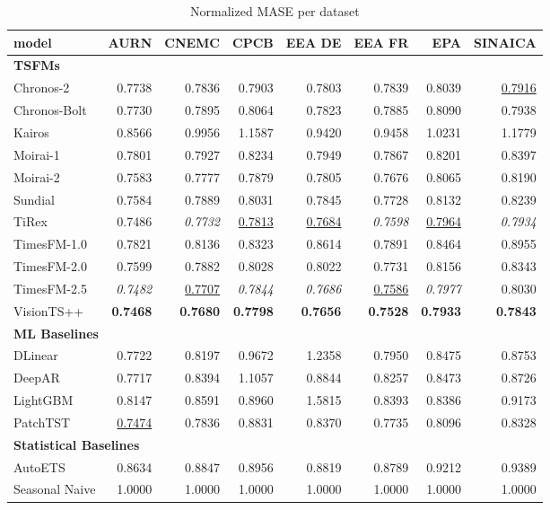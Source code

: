 \begin{table}[H]
\caption{Normalized MASE per dataset}
\centering
\begin{small}
\begin{tabular}{lrrrrrrr}
\toprule
model & AURN & CNEMC & CPCB & EEA DE & EEA FR & EPA & SINAICA \\
\midrule
\multicolumn{8}{l}{\textbf{TSFMs}} \\
Chronos-2 & 0.7738 & 0.7836 & 0.7903 & 0.7803 & 0.7839 & 0.8039 & \underline{0.7916} \\
Chronos-Bolt & 0.7730 & 0.7895 & 0.8064 & 0.7823 & 0.7885 & 0.8090 & 0.7938 \\
Kairos & 0.8566 & 0.9956 & 1.1587 & 0.9420 & 0.9458 & 1.0231 & 1.1779 \\
Moirai-1 & 0.7801 & 0.7927 & 0.8234 & 0.7949 & 0.7867 & 0.8201 & 0.8397 \\
Moirai-2 & 0.7583 & 0.7777 & 0.7879 & 0.7805 & 0.7676 & 0.8065 & 0.8190 \\
Sundial & 0.7584 & 0.7889 & 0.8031 & 0.7845 & 0.7728 & 0.8132 & 0.8239 \\
TiRex & 0.7486 & \textit{0.7732} & \underline{0.7813} & \underline{0.7684} & \textit{0.7598} & \underline{0.7964} & \textit{0.7934} \\
TimesFM-1.0 & 0.7821 & 0.8136 & 0.8323 & 0.8614 & 0.7891 & 0.8464 & 0.8955 \\
TimesFM-2.0 & 0.7599 & 0.7882 & 0.8028 & 0.8022 & 0.7731 & 0.8156 & 0.8343 \\
TimesFM-2.5 & \textit{0.7482} & \underline{0.7707} & \textit{0.7844} & \textit{0.7686} & \underline{0.7586} & \textit{0.7977} & 0.8030 \\
VisionTS++ & \textbf{0.7468} & \textbf{0.7680} & \textbf{0.7798} & \textbf{0.7656} & \textbf{0.7528} & \textbf{0.7933} & \textbf{0.7843} \\
\midrule
\multicolumn{8}{l}{\textbf{ML Baselines}} \\
DLinear & 0.7722 & 0.8197 & 0.9672 & 1.2358 & 0.7950 & 0.8475 & 0.8753 \\
DeepAR & 0.7717 & 0.8394 & 1.1057 & 0.8844 & 0.8257 & 0.8473 & 0.8726 \\
LightGBM & 0.8147 & 0.8591 & 0.8960 & 1.5815 & 0.8393 & 0.8386 & 0.9173 \\
PatchTST & \underline{0.7474} & 0.7836 & 0.8831 & 0.8370 & 0.7735 & 0.8096 & 0.8328 \\
\midrule
\multicolumn{8}{l}{\textbf{Statistical Baselines}} \\
AutoETS & 0.8634 & 0.8847 & 0.8956 & 0.8819 & 0.8789 & 0.9212 & 0.9389 \\
Seasonal Naive & 1.0000 & 1.0000 & 1.0000 & 1.0000 & 1.0000 & 1.0000 & 1.0000 \\
\bottomrule
\end{tabular}
\end{small}
\end{table}